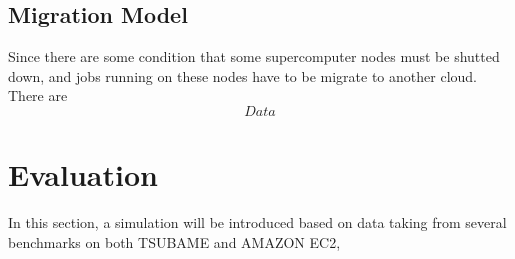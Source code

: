 \documentclass[JIP,draft]{ipsj}
\begin{document}
\subsection{Migration Model}
Since there are some condition that some supercomputer nodes must be shutted down, and jobs running on these nodes have to be migrate to another cloud. There are 
\begin{equation}
	Data	
\end{equation}
\section{Evaluation}
In this section, a simulation will be introduced based on data taking from several benchmarks on both TSUBAME and AMAZON EC2, 
\end{document}
